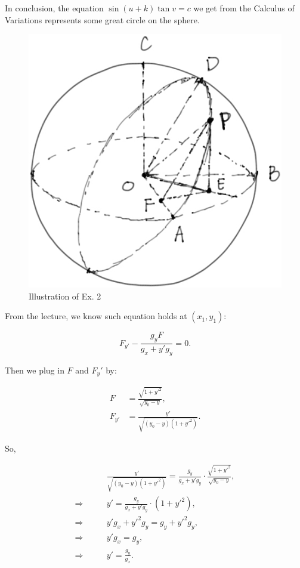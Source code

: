 \documentclass[
  course = {{16-811 Math Fundamentals for Robotics}},
  quartile = {{1}},
  assignment = 5,
  name = {{Kangle Deng}},
  email = {{kangled@andrew.cmu.edu}},
  firstexercise = 1
]{aga-homework}
\begin{document}
In conclusion, the equation  $\sin(u+k)\tan v = c$ we get from the Calculus of Variations represents some great circle on the sphere.

\begin{figure}
    \centering
    \includegraphics[width=.4\textwidth]{math/fig/hw5/hw5_ex2.jpeg}
    \caption{Illustration of Ex. 2}
    \label{fig:hw5_ex2}
\end{figure}

\exercise

From the lecture, we know such equation holds at $(x_1, y_1)$:

\begin{equation*}
    F_{y'} - \frac{g_yF}{g_x+y'g_y} = 0.
\end{equation*}

Then we plug in $F$ and $F_y'$ by:

\begin{equation*}
    \begin{aligned}
     F  & = \frac{\sqrt{1+y'^2}}{\sqrt{y_0-y}}, \\
     F_{y'} & = \frac{y'}{\sqrt{(y_0-y)(1+y'^2)}}.
    \end{aligned}
\end{equation*}

So,

\begin{equation*}
    \begin{aligned}
     & \frac{y'}{\sqrt{(y_0-y)(1+y'^2)}} = \frac{g_y}{g_x+y'g_y} \cdot \frac{\sqrt{1+y'^2}}{\sqrt{y_0-y}}, \\
     \Rightarrow \qquad & y' = \frac{g_y}{g_x+y'g_y} \cdot (1+y'^2), \\
     \Rightarrow \qquad & y'g_x + y'^2g_y = g_y + y'^2g_y, \\
     \Rightarrow \qquad & y'g_x = g_y, \\
     \Rightarrow \qquad & y'= \frac{g_y}{g_x}.
    \end{aligned}
\end{equation*}
\end{document}
